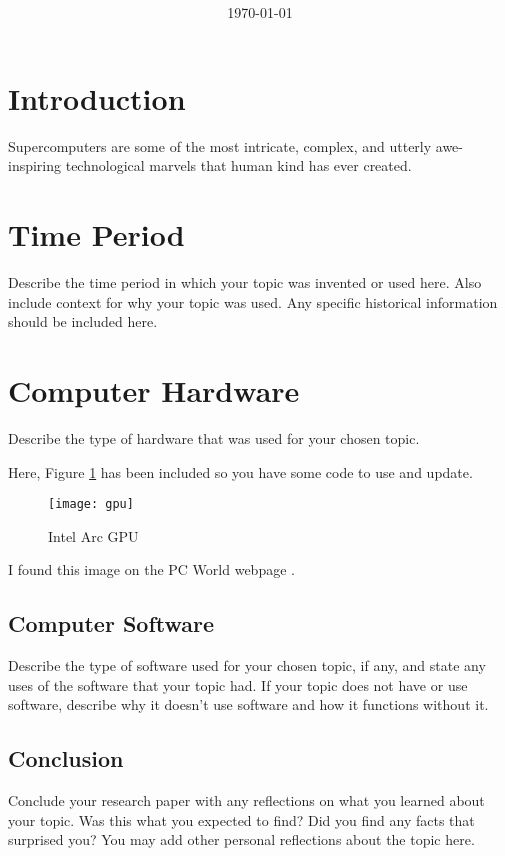 \documentclass[11pt, twocolumn]{article}
\title{{\large } \thetitle}
\author{\theauthor}
\date{\today}
\begin{document}
\maketitle

\thispagestyle{firstpage}

\section{Introduction}
Supercomputers are some of the most intricate, complex, and utterly awe-inspiring technological marvels that human kind has ever created. 

\section{Time Period}
Describe the time period in which your topic was invented or used here. Also include
context for why your topic was used. Any specific historical information should be 
included here.

\section{Computer Hardware}
Describe the type of hardware that was used for your chosen topic.

Here, Figure \ref{fig:gpu} has been included so you have some code to use and update.
\begin{figure}
    \centering
    \texttt{[image: gpu]}
    \caption{Intel Arc GPU}
    \label{fig:gpu}
\end{figure}

I found this image on the PC World webpage \cite{Ung21}. 

\subsection{Computer Software}
Describe the type of software used for your chosen topic, if any, and state any uses
of the software that your topic had. If your topic does not have or use software, 
describe why it doesn't use software and how it functions without it.

\subsection{Conclusion}
Conclude your research paper with any reflections on what you learned about your 
topic. Was this what you expected to find? Did you find any facts that surprised you?
You may add other personal reflections about the topic here.



\end{document}
